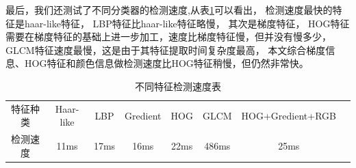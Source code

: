 最后，我们还测试了不同分类器的检测速度,从表\ref{tab:tezhengcesudu}可以看出，
检测速度最快的特征是haar-like特征，
LBP特征比haar-like特征略慢，
其次是梯度特征，
HOG特征需要在梯度特征的基础上进一步加工，速度比梯度特征慢，但并没有慢多少，
GLCM特征速度最慢，这是由于其特征提取时间复杂度最高，
本文综合梯度信息、HOG特征和颜色信息做检测速度比HOG特征稍慢，但仍然非常快。
\begin{table}
\centering
\begin{tabular}{cccccccp{38mm}}
\toprule
\mbox{特征种类} & \mbox{Haar-like} & \mbox{LBP} & \mbox{Gredient} & \mbox{HOG} & \mbox{GLCM} & \mbox{HOG+Gredient+RGB}  \\
\mbox{检测速度} & 11ms & 17ms & 16ms & 22ms & 486ms & 25ms \\
\bottomrule
\end{tabular}
\caption{不同特征检测速度表}
\label{tab:tezhengcesudu}
\end{table}
